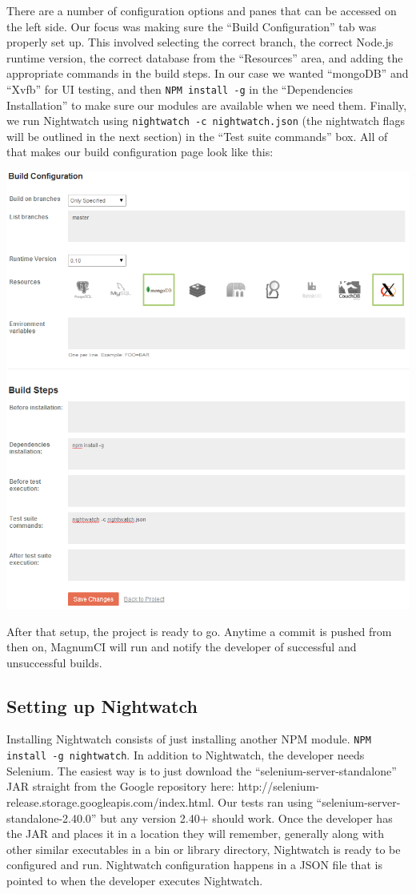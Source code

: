 \documentclass[12pt]{ucthesis}
\newenvironment{Figure}
  {\par\medskip\noindent\minipage{\linewidth}}
  {\endminipage\par\medskip}
\begin{document}
There are a number of configuration options and panes that can be accessed on the left side. Our focus was making sure the ``Build Configuration'' tab was properly set up. This involved selecting the correct branch, the correct Node.js runtime version, the correct database from the ``Resources'' area, and adding the appropriate commands in the build steps. In our case we wanted ``mongoDB'' and ``Xvfb'' for UI testing, and then \lstinline{NPM install -g} in the ``Dependencies Installation'' to make sure our modules are available when we need them. Finally, we run Nightwatch using \lstinline{nightwatch -c nightwatch.json} (the nightwatch flags will be outlined in the next section) in the ``Test suite commands'' box. All of that makes our build configuration page look like this:
\begin{Figure}
  \centering
  \includegraphics[width=0.75\linewidth]{magnumCI_customize_build_filled.png}
\end{Figure}

After that setup, the project is ready to go. Anytime a commit is pushed from then on, MagnumCI will run and notify the developer of successful and unsuccessful builds.

\subsection{Setting up Nightwatch}
Installing Nightwatch consists of just installing another NPM module. \lstinline{NPM install -g nightwatch}. In addition to Nightwatch, the developer needs Selenium. The easiest way is to just download the ``selenium-server-standalone'' JAR straight from the Google repository here: \newline http://selenium-release.storage.googleapis.com/index.html. Our tests ran using ``selenium-server-standalone-2.40.0'' but any version 2.40+ should work. Once the developer has the JAR and places it in a location they will remember, generally along with other similar executables in a bin or library directory, Nightwatch is ready to be configured and run. Nightwatch configuration happens in a JSON file that is pointed to when the developer executes Nightwatch. 
\end{document}
